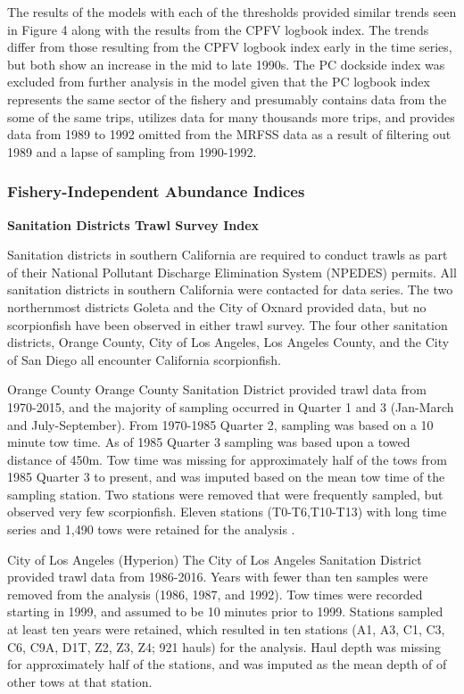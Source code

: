 \documentclass[12pt,]{article}
\begin{document}
The results of the models with each of the thresholds provided similar
trends seen in Figure 4 along with the results from the CPFV logbook
index. The trends differ from those resulting from the CPFV logbook
index early in the time series, but both show an increase in the mid to
late 1990s. The PC dockside index was excluded from further analysis in
the model given that the PC logbook index represents the same sector of
the fishery and presumably contains data from the some of the same
trips, utilizes data for many thousands more trips, and provides data
from 1989 to 1992 omitted from the MRFSS data as a result of filtering
out 1989 and a lapse of sampling from 1990-1992.

\subsubsection{Fishery-Independent Abundance
Indices}\label{fishery-independent-abundance-indices}

\textbf{Sanitation Districts Trawl Survey Index}

Sanitation districts in southern California are required to conduct
trawls as part of their National Pollutant Discharge Elimination System
(NPEDES) permits. All sanitation districts in southern California were
contacted for data series. The two northernmost districts Goleta and the
City of Oxnard provided data, but no scorpionfish have been observed in
either trawl survey. The four other sanitation districts, Orange County,
City of Los Angeles, Los Angeles County, and the City of San Diego all
encounter California scorpionfish.

Orange County Orange County Sanitation District provided trawl data from
1970-2015, and the majority of sampling occurred in Quarter 1 and 3
(Jan-March and July-September). From 1970-1985 Quarter 2, sampling was
based on a 10 minute tow time. As of 1985 Quarter 3 sampling was based
upon a towed distance of 450m. Tow time was missing for approximately
half of the tows from 1985 Quarter 3 to present, and was imputed based
on the mean tow time of the sampling station. Two stations were removed
that were frequently sampled, but observed very few scorpionfish. Eleven
stations (T0-T6,T10-T13) with long time series and 1,490 tows were
retained for the analysis .

City of Los Angeles (Hyperion) The City of Los Angeles Sanitation
District provided trawl data from 1986-2016. Years with fewer than ten
samples were removed from the analysis (1986, 1987, and 1992). Tow times
were recorded starting in 1999, and assumed to be 10 minutes prior to
1999. Stations sampled at least ten years were retained, which resulted
in ten stations (A1, A3, C1, C3, C6, C9A, D1T, Z2, Z3, Z4; 921 hauls)
for the analysis. Haul depth was missing for approximately half of the
stations, and was imputed as the mean depth of of other tows at that
station.
\end{document}
